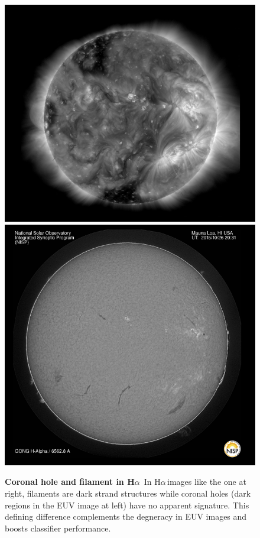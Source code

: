 \documentclass[twoside]{report}
\newcommand{\halpha}{H$\alpha$\,}
\begin{document}
\begin{figure}[ht]
  \begin{center}
    \includegraphics[scale=0.3]{halphacomp1}
    \includegraphics[scale=0.315]{halphacomp2}
    \caption{{\bf Coronal hole and filament in \halpha} In \halpha images like the one at right, filaments are dark strand structures while coronal holes (dark regions in the EUV image at left) have no apparent signature. This defining difference complements the degneracy in EUV images and boosts classifier performance.}
    \label{fig:halphause}
 \end{center}
\end{figure}
\end{document}
